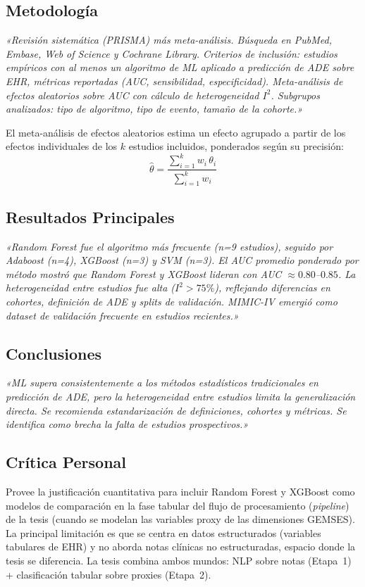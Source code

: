 \documentclass[11pt,a4paper]{article}
\newcommand{\cita}[1]{{\color{navy}\textit{«#1»}}}
\begin{document}
\subsection{Metodología}
\cita{Revisión sistemática (PRISMA) más meta-análisis. Búsqueda en PubMed, Embase, Web of Science y Cochrane Library. Criterios de inclusión: estudios empíricos con al menos un algoritmo de ML aplicado a predicción de ADE sobre EHR, métricas reportadas (AUC, sensibilidad, especificidad). Meta-análisis de efectos aleatorios sobre AUC con cálculo de heterogeneidad $I^{2}$. Subgrupos analizados: tipo de algoritmo, tipo de evento, tamaño de la cohorte.}

El meta-análisis de efectos aleatorios estima un efecto agrupado a partir de los efectos individuales de los $k$ estudios incluidos, ponderados según su precisión:
\begin{equation}
\hat{\theta} = \frac{\sum_{i=1}^{k} w_{i}\,\theta_{i}}{\sum_{i=1}^{k} w_{i}}
\end{equation}

\subsection{Resultados Principales}
\cita{Random Forest fue el algoritmo más frecuente (n=9 estudios), seguido por Adaboost (n=4), XGBoost (n=3) y SVM (n=3). El AUC promedio ponderado por método mostró que Random Forest y XGBoost lideran con AUC $\approx 0.80$--$0.85$. La heterogeneidad entre estudios fue alta ($I^{2}>75\%$), reflejando diferencias en cohortes, definición de ADE y splits de validación. MIMIC-IV emergió como dataset de validación frecuente en estudios recientes.}

\subsection{Conclusiones}
\cita{ML supera consistentemente a los métodos estadísticos tradicionales en predicción de ADE, pero la heterogeneidad entre estudios limita la generalización directa. Se recomienda estandarización de definiciones, cohortes y métricas. Se identifica como brecha la falta de estudios prospectivos.}

\subsection{Crítica Personal}
Provee la justificación cuantitativa para incluir Random Forest y XGBoost como modelos de comparación en la fase tabular del flujo de procesamiento (\textit{pipeline}) de la tesis (cuando se modelan las variables proxy de las dimensiones GEMSES). La principal limitación es que se centra en datos estructurados (variables tabulares de EHR) y no aborda notas clínicas no estructuradas, espacio donde la tesis se diferencia. La tesis combina ambos mundos: NLP sobre notas (Etapa~1) + clasificación tabular sobre proxies (Etapa~2).
\end{document}
